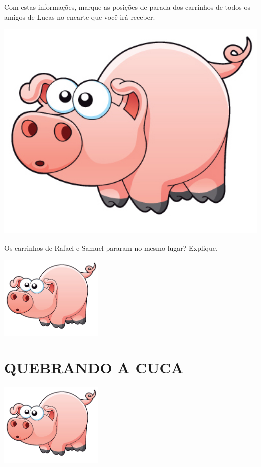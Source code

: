 \documentclass[a4,12pt]{book}
\begin{document}
Com estas informações, marque as posições de parada dos carrinhos de todos os amigos de Lucas no encarte que você irá receber.

\includegraphics[width=600pt, keepaspectratio]{pig}

Os carrinhos de Rafael e Samuel pararam no mesmo lugar? Explique.















\includegraphics[width=\textwidth,height=4cm, keepaspectratio]{pig}
\section*{ QUEBRANDO A CUCA }
 


\includegraphics[width=\textwidth,height=4cm, keepaspectratio]{pig}
\end{document}
